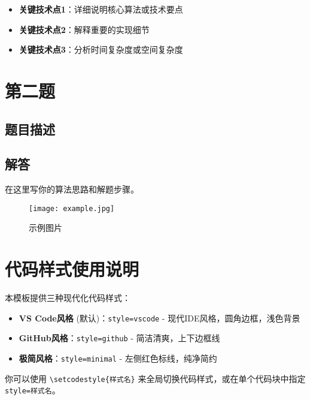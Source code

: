 \documentclass[12pt,a4paper]{article}
\numberwithin{equation}{section}
\newenvironment{solution}
{\begin{tcolorbox}[colback=pkured!5,colframe=pkured,title=算法思路,fonttitle=\bfseries\color{white}]}
{\end{tcolorbox}}
\begin{document}
\begin{keypoints}
\begin{itemize}[leftmargin=15pt]
    \item \textbf{关键技术点1}：详细说明核心算法或技术要点
    \item \textbf{关键技术点2}：解释重要的实现细节
    \item \textbf{关键技术点3}：分析时间复杂度或空间复杂度
\end{itemize}
\end{keypoints}

\section{第二题}

\subsection{题目描述}

\subsection{解答}

\begin{solution}
在这里写你的算法思路和解题步骤。
\end{solution}

\begin{figure}[H]
    \centering
    \texttt{[image: example.jpg]}
    \caption{示例图片}
    \label{fig:example}
\end{figure}

\section{代码样式使用说明}

本模板提供三种现代化代码样式：

\begin{itemize}[leftmargin=20pt]
    \item \textbf{VS Code风格} (默认)：\texttt{style=vscode} - 现代IDE风格，圆角边框，浅色背景
    \item \textbf{GitHub风格}：\texttt{style=github} - 简洁清爽，上下边框线
    \item \textbf{极简风格}：\texttt{style=minimal} - 左侧红色标线，纯净简约
\end{itemize}

你可以使用 \texttt{\textbackslash setcodestyle\{样式名\}} 来全局切换代码样式，或在单个代码块中指定 \texttt{style=样式名}。
\end{document}
